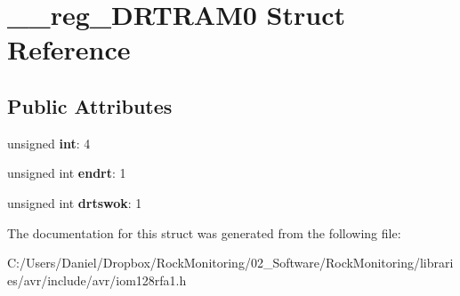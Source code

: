 \hypertarget{struct____reg___d_r_t_r_a_m0}{}\section{\+\_\+\+\_\+reg\+\_\+\+D\+R\+T\+R\+A\+M0 Struct Reference}
\label{struct____reg___d_r_t_r_a_m0}
\subsection*{Public Attributes}
\begin{DoxyCompactItemize}
\item 
unsigned {\bfseries int}\+: 4\hypertarget{struct____reg___d_r_t_r_a_m0_aed80a4383dc85894d6cbc044b66ef43a}{}\label{struct____reg___d_r_t_r_a_m0_aed80a4383dc85894d6cbc044b66ef43a}

\item 
unsigned int {\bfseries endrt}\+: 1\hypertarget{struct____reg___d_r_t_r_a_m0_a95047926e545c6a62ce63b1cbe3a027a}{}\label{struct____reg___d_r_t_r_a_m0_a95047926e545c6a62ce63b1cbe3a027a}

\item 
unsigned int {\bfseries drtswok}\+: 1\hypertarget{struct____reg___d_r_t_r_a_m0_ad65de4072e41f88b5fde504c7d37b40f}{}\label{struct____reg___d_r_t_r_a_m0_ad65de4072e41f88b5fde504c7d37b40f}

\end{DoxyCompactItemize}


The documentation for this struct was generated from the following file\+:\begin{DoxyCompactItemize}
\item 
C\+:/\+Users/\+Daniel/\+Dropbox/\+Rock\+Monitoring/02\+\_\+\+Software/\+Rock\+Monitoring/libraries/avr/include/avr/iom128rfa1.\+h\end{DoxyCompactItemize}
